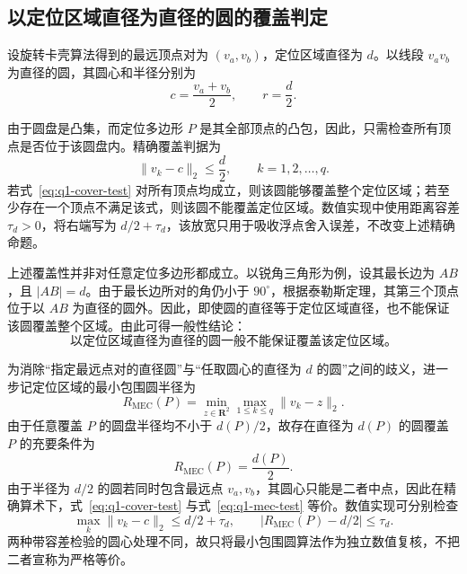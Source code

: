 \subsection{以定位区域直径为直径的圆的覆盖判定}

设旋转卡壳算法得到的最远顶点对为 $(v_a,v_b)$，定位区域直径为 $d$。以线段 $v_av_b$ 为直径的圆，其圆心和半径分别为
\begin{equation}
  c=\frac{v_a+v_b}{2},
  \qquad
  r=\frac{d}{2}.
  \label{eq:q1-diameter-circle}
\end{equation}

由于圆盘是凸集，而定位多边形 $P$ 是其全部顶点的凸包，因此，只需检查所有顶点是否位于该圆盘内。精确覆盖判据为
\begin{equation}
  \|v_k-c\|_2\leq \frac{d}{2},
  \qquad k=1,2,\ldots,q.
  \label{eq:q1-cover-test}
\end{equation}
若式~\eqref{eq:q1-cover-test} 对所有顶点均成立，则该圆能够覆盖整个定位区域；若至少存在一个顶点不满足该式，则该圆不能覆盖定位区域。数值实现中使用距离容差 $\tau_d>0$，将右端写为 $d/2+\tau_d$，该放宽只用于吸收浮点舍入误差，不改变上述精确命题。

上述覆盖性并非对任意定位多边形都成立。以锐角三角形为例，设其最长边为 $AB$，且 $|AB|=d$。由于最长边所对的角仍小于 $90^\circ$，根据泰勒斯定理，其第三个顶点位于以 $AB$ 为直径的圆外。因此，即使圆的直径等于定位区域直径，也不能保证该圆覆盖整个区域。由此可得一般性结论：
\begin{equation}
  \boxed{\text{以定位区域直径为直径的圆一般不能保证覆盖该定位区域。}}
  \label{eq:q1-general-conclusion}
\end{equation}

为消除“指定最远点对的直径圆”与“任取圆心的直径为 $d$ 的圆”之间的歧义，进一步记定位区域的最小包围圆半径为
\begin{equation}
  R_{\mathrm{MEC}}(P)
  =\min_{z\in\mathbf R^2}\max_{1\leq k\leq q}\|v_k-z\|_2.
  \label{eq:q1-mec-radius}
\end{equation}
由于任意覆盖 $P$ 的圆盘半径均不小于 $d(P)/2$，故存在直径为 $d(P)$ 的圆覆盖 $P$ 的充要条件为
\begin{equation}
  R_{\mathrm{MEC}}(P)=\frac{d(P)}{2}.
  \label{eq:q1-mec-test}
\end{equation}
由于半径为 $d/2$ 的圆若同时包含最远点 $v_a,v_b$，其圆心只能是二者中点，因此在精确算术下，式~\eqref{eq:q1-cover-test} 与式~\eqref{eq:q1-mec-test} 等价。数值实现可分别检查
\[
  \max_k\|v_k-c\|_2\leq d/2+\tau_d,
  \qquad
  \left|R_{\mathrm{MEC}}(P)-d/2\right|\leq\tau_d.
\]
两种带容差检验的圆心处理不同，故只将最小包围圆算法作为独立数值复核，不把二者宣称为严格等价。

